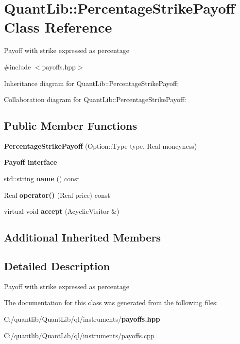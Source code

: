 \section{Quant\+Lib\+:\+:Percentage\+Strike\+Payoff Class Reference}
\label{class_quant_lib_1_1_percentage_strike_payoff}


Payoff with strike expressed as percentage  




{\ttfamily \#include $<$payoffs.\+hpp$>$}



Inheritance diagram for Quant\+Lib\+:\+:Percentage\+Strike\+Payoff\+:


Collaboration diagram for Quant\+Lib\+:\+:Percentage\+Strike\+Payoff\+:
\subsection*{Public Member Functions}
\begin{DoxyCompactItemize}
\item 
{\bfseries Percentage\+Strike\+Payoff} (Option\+::\+Type type, Real moneyness)\label{class_quant_lib_1_1_percentage_strike_payoff_a26052d3935c314d8edef1e8cd25ae982}

\end{DoxyCompactItemize}
\begin{Indent}{\bf Payoff interface}\par
\begin{DoxyCompactItemize}
\item 
std\+::string {\bfseries name} () const \label{class_quant_lib_1_1_percentage_strike_payoff_a77d726c500bf5998e2506d13d4f35792}

\item 
Real {\bfseries operator()} (Real price) const \label{class_quant_lib_1_1_percentage_strike_payoff_a5ac168c7579e3235cbe8c0d6543a847e}

\item 
virtual void {\bfseries accept} (Acyclic\+Visitor \&)\label{class_quant_lib_1_1_percentage_strike_payoff_a7cf35825df53a0dfab4e30c5f08da5b4}

\end{DoxyCompactItemize}
\end{Indent}
\subsection*{Additional Inherited Members}


\subsection{Detailed Description}
Payoff with strike expressed as percentage 

The documentation for this class was generated from the following files\+:\begin{DoxyCompactItemize}
\item 
C\+:/quantlib/\+Quant\+Lib/ql/instruments/{\bf payoffs.\+hpp}\item 
C\+:/quantlib/\+Quant\+Lib/ql/instruments/payoffs.\+cpp\end{DoxyCompactItemize}
